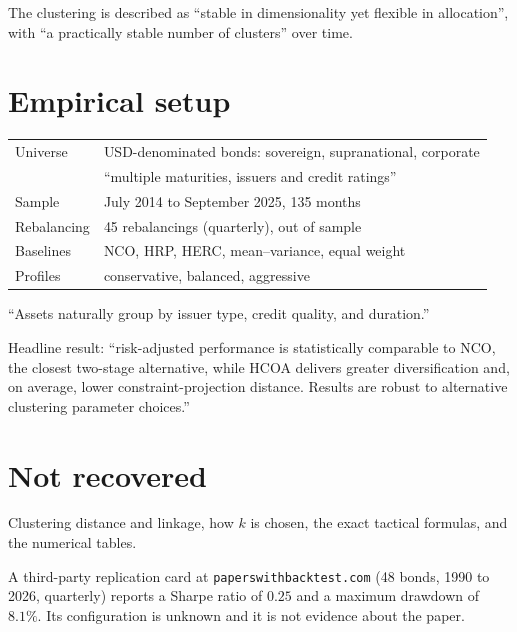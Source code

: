 \documentclass[11pt]{article}
\begin{document}
The clustering is described as ``stable in dimensionality yet flexible in
allocation'', with ``a practically stable number of clusters'' over time.

\section*{Empirical setup}

\begin{center}
\begin{tabular}{@{}ll@{}}
\toprule
Universe & USD-denominated bonds: sovereign, supranational, corporate \\
         & ``multiple maturities, issuers and credit ratings'' \\
Sample   & July 2014 to September 2025, 135 months \\
Rebalancing & 45 rebalancings (quarterly), out of sample \\
Baselines & NCO, HRP, HERC, mean--variance, equal weight \\
Profiles & conservative, balanced, aggressive \\
\bottomrule
\end{tabular}
\end{center}

``Assets naturally group by issuer type, credit quality, and duration.''

Headline result: ``risk-adjusted performance is statistically comparable to
NCO, the closest two-stage alternative, while HCOA delivers greater
diversification and, on average, lower constraint-projection distance.
Results are robust to alternative clustering parameter choices.''

\section*{Not recovered}

Clustering distance and linkage, how $k$ is chosen, the exact tactical
formulas, and the numerical tables.

A third-party replication card at \texttt{paperswithbacktest.com} (48
bonds, 1990 to 2026, quarterly) reports a Sharpe ratio of $0.25$ and a
maximum drawdown of $8.1\%$. Its configuration is unknown and it is not
evidence about the paper.
\end{document}
